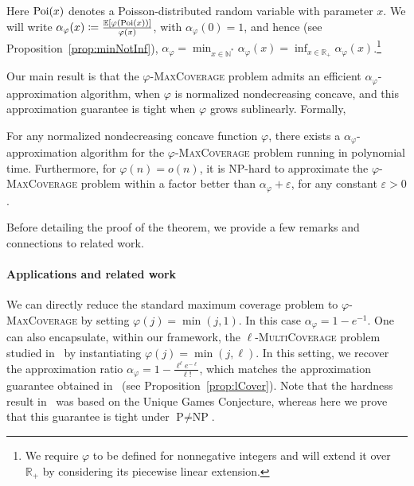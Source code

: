 Here $\operatorname{\text{Poi}}(x)$ denotes a Poisson-distributed random variable with parameter $x$. We will write $\alpha_{\varphi}(x) \coloneqq \frac{\mathbb{E}[\varphi(\operatorname{\text{Poi}}(x))]}{\varphi(x)}$, with $\alpha_{\varphi}(0) = 1$, and hence (see Proposition~\ref{prop:minNotInf}), $\alpha_{\varphi}  = \min_{x \in  \mathbb{N}^*} \alpha_{\varphi}(x) = \inf_{x \in \mathbb{R}_+} \alpha_{\varphi}(x)$.\footnote{We require $\varphi$ to be defined for nonnegative integers and will extend it over $\mathbb{R}_+$ by considering its piecewise linear extension.}

Our main result is that the $\varphi$-\textsc{MaxCoverage} problem admits an efficient $\alpha_\varphi$-approximation algorithm, when $\varphi$ is normalized nondecreasing concave, and this approximation guarantee is tight when $\varphi$ grows sublinearly. Formally,  

\begin{theorem}
For any normalized nondecreasing concave function $\varphi$, there exists a $\alpha_\varphi$-approximation algorithm for the $\varphi$-\textsc{MaxCoverage} problem running in polynomial time. Furthermore, for $\varphi(n) = o(n)$, it is \textrm{NP}-hard to approximate the $\varphi$-\textsc{MaxCoverage} problem within a factor better than $\alpha_\varphi + \varepsilon$, for any constant $\varepsilon >0$.
\label{theo:main}
\end{theorem}

Before detailing the proof of the theorem, we provide a few remarks and connections to related work.

\paragraph{Applications and related work}
We can directly reduce the standard maximum coverage problem to $\varphi$-\textsc{MaxCoverage} by setting $\varphi(j) = \min(j,1)$. In this case $\alpha_{\varphi} = 1 - e^{-1}$. One can also encapsulate, within our framework, the $\ell$-\textsc{MultiCoverage} problem studied in~\cite{BFGG20} by instantiating $\varphi(j) = \min(j,\ell)$. In this setting, we recover the approximation ratio $\alpha_{\varphi} = 1-\frac{\ell^{\ell}e^{-\ell}}{\ell!}$, which matches the approximation guarantee obtained in~\cite{BFGG20} (see Proposition~\ref{prop:lCover}). Note that the hardness result in~\cite{BFGG20} was based on the Unique Games Conjecture, whereas here we prove that this guarantee is tight under $\textrm{P} \not= \textrm{NP}$.

